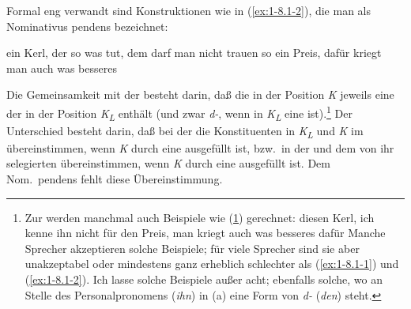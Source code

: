 \documentclass[output=paper]{langsci/langscibook}
\begin{document}
Formal eng verwandt sind Konstruktionen wie in (\ref{ex:1-8.1-2}), die man als Nominativus pendens bezeichnet:
\begin{exe}
\ex\label{ex:1-8.1-2}
\begin{xlist}
\ex\label{ex:1-8.1-2a} ein Kerl, der so was tut, dem darf man nicht trauen
\ex\label{ex:1-8.1-2b} so ein Preis, dafür kriegt man auch was besseres
\end{xlist}
\end{exe}
Die Gemeinsamkeit mit der  besteht darin, daß die  in
der Position \textit{K} jeweils eine  der  in der Position \textit{K\textsubscript{L}} enthält (und
zwar \textit{d-}, wenn in \textit{K\textsubscript{L}} eine  ist).\footnote{%
  Zur  werden manchmal auch Beispiele wie (\ref{ex:1-fn31i}) gerechnet:
  \eal
  \label{ex:1-fn31i}
  \ex
  \label{ex:1-fn31ia}
  diesen Kerl, ich kenne ihn nicht
  \ex
  \label{ex:1-fn31ib}
  für den Preis, man kriegt auch was besseres dafür
  \zl
  Manche Sprecher akzeptieren solche Beispiele; für viele Sprecher sind sie aber unakzeptabel oder
  mindestens ganz erheblich schlechter als (\ref{ex:1-8.1-1}) und (\ref{ex:1-8.1-2}). Ich lasse solche Beispiele außer acht; ebenfalls
  solche, wo an Stelle des Personalpronomens (\textit{ihn}) in (a) eine Form von \textit{d-}
  (\textit{den}) steht.%
}
Der Unterschied besteht darin, daß
bei der  die Konstituenten in \textit{K\textsubscript{L}} und \textit{K} im  übereinstimmen,
wenn \textit{K} durch eine  ausgefüllt ist, bzw.\ in der  und dem
von ihr selegierten  übereinstimmen, wenn \textit{K} durch eine 
ausgefüllt ist. Dem Nom.\ pendens fehlt diese Übereinstimmung.
\end{document}

